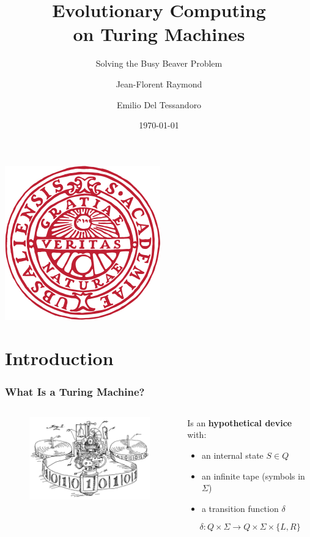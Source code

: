 \documentclass{beamer}
\title{\textbf{Evolutionary Computing \\on Turing Machines}}
\subtitle{Solving the Busy Beaver Problem}
\author{Jean-Florent Raymond \and Emilio Del Tessandoro}
\institute[Uppsala University]{Uppsala University}
\date{\today}
\begin{document}
\begin{frame}
\titlepage
\vspace{-2cm}
\begin{flushright}
\includegraphics[scale=0.3]{figures/uu_logo.png}  
\end{flushright}

\end{frame}

\section{Introduction}

\begin{frame}
\frametitle{What Is a Turing Machine?}
\begin{columns}[c]
	\begin{column}{5.5cm}
		\begin{figure}
		\includegraphics[width=5.5cm]{figures/turingMachine.png}
		\end{figure}
	\end{column}
	\begin{column}{6cm}
		Is an \textbf{hypothetical device} with:
		\begin{itemize}
		\item an internal state $S \in Q$
		\item an infinite tape (symbols in $\Sigma$)
		\item a transition function $\delta$
		\end{itemize}
		
		\[\delta : Q \times \Sigma \to Q \times \Sigma \times \{L,R\}\]
	\end{column}
\end{columns}
\end{frame}
\end{document}
